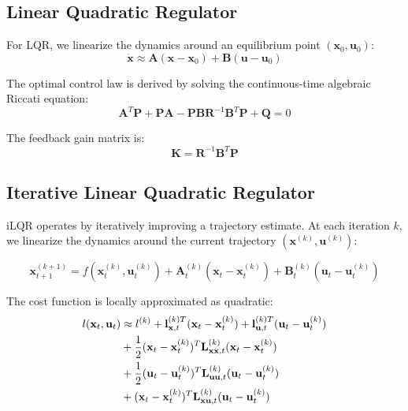 \documentclass[conference]{IEEEtran}
\begin{document}
\subsection{Linear Quadratic Regulator}

For LQR, we linearize the dynamics around an equilibrium point $(\mathbf{x}_0, \mathbf{u}_0)$:
\begin{equation}
\dot{\mathbf{x}} \approx \mathbf{A}(\mathbf{x} - \mathbf{x}_0) + \mathbf{B}(\mathbf{u} - \mathbf{u}_0)
\end{equation}

The optimal control law is derived by solving the continuous-time algebraic Riccati equation:
\begin{equation}
\mathbf{A}^T\mathbf{P} + \mathbf{P}\mathbf{A} - \mathbf{P}\mathbf{B}\mathbf{R}^{-1}\mathbf{B}^T\mathbf{P} + \mathbf{Q} = 0
\end{equation}

The feedback gain matrix is:
\begin{equation}
\mathbf{K} = \mathbf{R}^{-1}\mathbf{B}^T\mathbf{P}
\end{equation}

\subsection{Iterative Linear Quadratic Regulator}

iLQR operates by iteratively improving a trajectory estimate. At each iteration $k$, we linearize the dynamics around the current trajectory $(\mathbf{x}^{(k)}, \mathbf{u}^{(k)})$:

\begin{equation}
\mathbf{x}_{t+1}^{(k+1)} = f(\mathbf{x}_t^{(k)}, \mathbf{u}_t^{(k)}) + \mathbf{A}_t^{(k)}(\mathbf{x}_t - \mathbf{x}_t^{(k)}) + \mathbf{B}_t^{(k)}(\mathbf{u}_t - \mathbf{u}_t^{(k)})
\end{equation}

The cost function is locally approximated as quadratic:
\begin{align}
l(\mathbf{x}_t, \mathbf{u}_t) &\approx l^{(k)} + \mathbf{l}_{\mathbf{x},t}^{(k)T}(\mathbf{x}_t - \mathbf{x}_t^{(k)}) + \mathbf{l}_{\mathbf{u},t}^{(k)T}(\mathbf{u}_t - \mathbf{u}_t^{(k)}) \notag \\
&+ \frac{1}{2}(\mathbf{x}_t - \mathbf{x}_t^{(k)})^T\mathbf{L}_{\mathbf{xx},t}^{(k)}(\mathbf{x}_t - \mathbf{x}_t^{(k)}) \notag \\
&+ \frac{1}{2}(\mathbf{u}_t - \mathbf{u}_t^{(k)})^T\mathbf{L}_{\mathbf{uu},t}^{(k)}(\mathbf{u}_t - \mathbf{u}_t^{(k)}) \notag \\
&+ (\mathbf{x}_t - \mathbf{x}_t^{(k)})^T\mathbf{L}_{\mathbf{xu},t}^{(k)}(\mathbf{u}_t - \mathbf{u}_t^{(k)})
\end{align}
\end{document}
